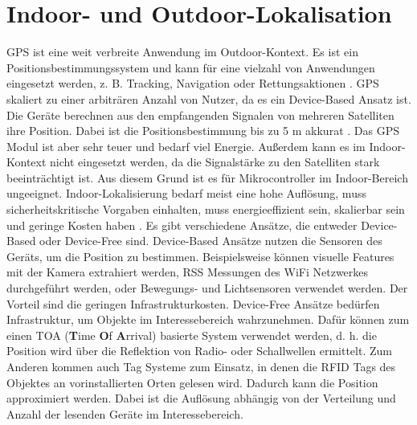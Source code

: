 \section{Indoor- und Outdoor-Lokalisation}
GPS ist eine weit verbreite Anwendung im Outdoor-Kontext.
Es ist ein Positionsbestimmungssystem und kann für eine vielzahl von Anwendungen eingesetzt werden,
z. B. Tracking, Navigation oder Rettungsaktionen \cite{kaplan2005understanding}.
GPS skaliert zu einer arbiträren Anzahl von Nutzer, da es ein Device-Based Ansatz ist.
Die Geräte berechnen aus den empfangenden Signalen von mehreren Satelliten ihre Position.
Dabei ist die Positionsbestimmung bis zu 5 m akkurat \cite{sadowski2018rssi}.
Das GPS Modul ist aber sehr teuer und bedarf viel Energie.
Außerdem kann es im Indoor-Kontext nicht eingesetzt werden, da die Signalstärke zu den Satelliten stark beeinträchtigt ist.
Aus diesem Grund ist es für Mikrocontroller im Indoor-Bereich ungeeignet.
\newline
\newline
Indoor-Lokalisierung bedarf meist eine hohe Auflösung, muss sicherheitskritische Vorgaben einhalten,
muss energieeffizient sein, skalierbar sein und geringe Kosten haben \cite{xiao2016survey}.
Es gibt verschiedene Ansätze, die entweder Device-Based oder Device-Free sind.
\newline
\newline
Device-Based Ansätze nutzen die Sensoren des Geräts, um die Position zu bestimmen.
Beispielsweise können visuelle Features mit der Kamera extrahiert werden,
RSS Messungen des WiFi Netzwerkes durchgeführt werden, oder Bewegungs- und Lichtsensoren verwendet werden.
Der Vorteil sind die geringen Infrastrukturkosten.
\newline
\newline
Device-Free Ansätze bedürfen Infrastruktur, um Objekte im Interessebereich wahrzunehmen.
Dafür können zum einen TOA (\textbf{T}ime \textbf{O}f \textbf{A}rrival) basierte System verwendet werden, d. h. die Position wird über
die Reflektion von Radio- oder Schallwellen ermittelt.
Zum Anderen kommen auch Tag Systeme zum Einsatz, in denen die RFID Tags des Objektes an vorinstallierten Orten gelesen wird.
Dadurch kann die Position approximiert werden.
Dabei ist die Auflösung abhängig von der Verteilung und Anzahl der lesenden Geräte im Interessebereich.